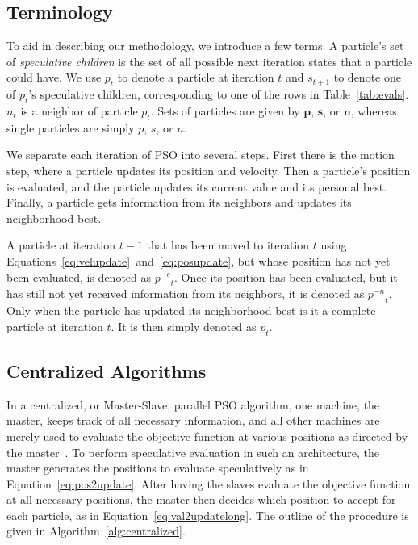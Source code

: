 \documentclass[journal,letterpaper]{IEEEtran}
\newcommand{\alg}[1]{Algorithm~\ref{alg:#1}}
\providecommand{\noeval}[1]{\ensuremath{#1^{-e}}}
\providecommand{\nonbest}[1]{\ensuremath{#1^{-n}}}
\providecommand{\p}{\ensuremath{p}}
\providecommand{\pset}{\ensuremath{\mathbf{p}}}
\providecommand{\s}{\ensuremath{s}}
\providecommand{\sset}{\ensuremath{\mathbf{s}}}
\providecommand{\n}{\ensuremath{n}}
\providecommand{\nset}{\ensuremath{\mathbf{n}}}
\begin{document}
\subsection{Terminology}

To aid in describing our methodology, we introduce a few terms.  A particle's
set of \emph{speculative children} is the set of all possible next iteration
states that a particle could have.  We use $\p_t$ to denote a particle at
iteration $t$ and $\s_{t+1}$ to denote one of $\p_t$'s speculative children,
corresponding to one of the rows in Table~\ref{tab:evals}.  $\n_t$ is a
neighbor of particle $\p_t$.  Sets of particles are given by $\pset$, $\sset$,
or $\nset$, whereas single particles are simply $\p$, $\s$, or $\n$.

We separate each iteration of PSO into several steps.  First there is the
motion step, where a particle updates its position and velocity.  Then a
particle's position is evaluated, and the particle updates its current value
and its personal best.  Finally, a particle gets information from its neighbors
and updates its neighborhood best.

A particle at iteration $t-1$ that has been moved to iteration $t$ using
Equations~\eqref{eq:velupdate}~and~\eqref{eq:posupdate}, but whose position has
not yet been evaluated, is denoted as $\noeval{\p}_t$.  Once its position has
been evaluated, but it has still not yet received information from its
neighbors, it is denoted as $\nonbest{\p}_t$.  Only when the particle has
updated its neighborhood best is it a complete particle at iteration $t$.  It
is then simply denoted as $\p_t$.

\subsection{Centralized Algorithms}

In a centralized, or Master-Slave, parallel PSO algorithm, one machine, the
master, keeps track of all necessary information, and all other machines are
merely used to evaluate the objective function at various positions as directed
by the master~\cite{belal-2004-parallel-models-for-pso}.  To perform
speculative evaluation in such an architecture, the master generates the
positions to evaluate speculatively as in Equation~\eqref{eq:pos2update}.
After having the slaves evaluate the objective function at all necessary
positions, the master then decides which position to accept for each particle,
as in Equation~\eqref{eq:val2updatelong}.  The outline of the procedure is
given in \alg{centralized}.
\end{document}
